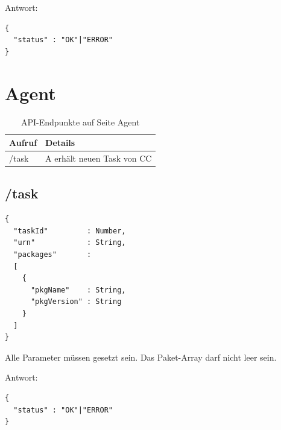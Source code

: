 Antwort: 

\begin{verbatim}
{
  "status" : "OK"|"ERROR" 
}
\end{verbatim}

\section*{Agent}

\begin{table}[H]
    \centering
    \caption{API-Endpunkte auf Seite Agent}
    \label{api:endpoints_a}
    \begin{tabular}{ll}
        \hline
        \textbf{Aufruf}  & \textbf{Details}            \\ \hline
        /task            & A erhält neuen Task von CC  \\ \hline
    \end{tabular}
\end{table}

\subsection*{/task}

\begin{verbatim}
{
  "taskId"         : Number,
  "urn"            : String,
  "packages"       : 
  [
    {
      "pkgName"    : String,
      "pkgVersion" : String
    }
  ]
}
\end{verbatim}

Alle Parameter müssen gesetzt sein. Das Paket-Array darf nicht leer sein.


Antwort:

\begin{verbatim}
{
  "status" : "OK"|"ERROR" 
}
\end{verbatim}